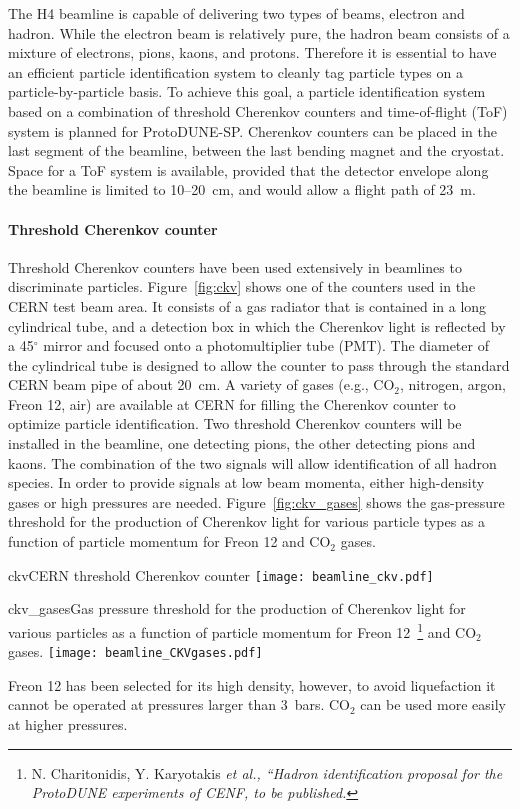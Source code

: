 The H4 beamline is capable of delivering two types of beams, electron and hadron. %
While the electron beam is relatively pure, the hadron beam consists of a mixture of electrons, pions, kaons, and protons. Therefore it is essential to have an efficient particle identification system to cleanly tag particle types on a particle-by-particle basis. To achieve this goal, a particle identification system based on a combination of threshold Cherenkov counters and time-of-flight (ToF) system is planned for ProtoDUNE-SP. 
Cherenkov counters can be placed in the last segment of the beamline, between the last bending magnet and the cryostat. Space for a ToF system is available, provided that the detector envelope along the beamline is limited to 10--20~cm,
and would allow a flight path of 23~m.

\paragraph{Threshold Cherenkov counter}
Threshold Cherenkov counters have been used extensively in beamlines to discriminate particles. Figure~\ref{fig:ckv} shows one of the counters used in the CERN test beam area. It consists of a gas radiator that is contained in a long cylindrical tube, and a detection box in which the Cherenkov light is reflected by a 45$^\circ$ mirror and focused onto a photomultiplier tube (PMT). The diameter of the cylindrical tube is designed to allow the counter to pass through the standard CERN beam pipe of about 20~cm. A variety of gases (e.g., CO$_2$, nitrogen, argon, Freon 12, air) are available at CERN for filling the Cherenkov counter to optimize particle identification. 
Two threshold Cherenkov counters will be installed in the beamline, one detecting pions, the other detecting pions 
and kaons. The combination of the two signals will allow identification of all hadron species. In order to provide signals at low beam momenta, either high-density gases or high pressures are needed.
Figure~\ref{fig:ckv_gases} shows the gas-pressure threshold 
for the production of Cherenkov light for various particle types as a function of particle momentum for Freon 12 and CO$_2$ gases.
\begin{cdrfigure}{ckv}{CERN threshold Cherenkov counter}
  \texttt{[image: beamline\_ckv.pdf]}
\end{cdrfigure}
\begin{cdrfigure}{ckv_gases}{Gas pressure threshold for the production of Cherenkov light for various particles as a function of particle momentum for Freon 12~\footnote{N. Charitonidis, Y. Karyotakis \it{et al.}, ``Hadron identification proposal for the ProtoDUNE experiments of CENF, to be published.} and CO$_2$ gases.}
  \texttt{[image: beamline\_CKVgases.pdf]}
\end{cdrfigure}
Freon 12 has been selected for its high density, however,  to avoid liquefaction it cannot be operated at pressures larger than 3~bars.  CO$_2$ can be used more easily at higher pressures.  

